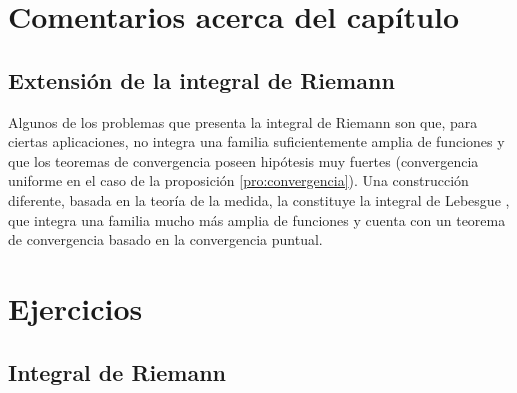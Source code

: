 \section{Comentarios acerca del cap\'itulo}

\subsection{Extensi\'on de la integral de Riemann}
Algunos de los problemas que presenta la integral de Riemann son que, para ciertas aplicaciones, no integra una familia suficientemente amplia de funciones y que los teoremas de convergencia poseen hip\'otesis muy fuertes (convergencia uniforme en el caso de la proposici\'on \ref{pro:convergencia}). Una construcci\'on diferente, basada en la teor\'ia de la medida, la constituye la integral de Lebesgue , que integra una familia mucho m\'as amplia de funciones y cuenta con un teorema de convergencia basado en la convergencia puntual.

 

\section{Ejercicios}

\subsection*{Integral de Riemann}



